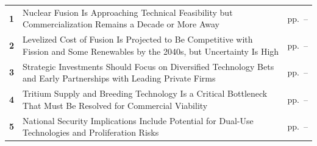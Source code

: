 \documentclass[10pt,a4paper]{article}
\begin{document}
\begin{tabularx}{\linewidth}{p{8mm}Yp{29mm}}
\textcolor{BOBlue}{\bfseries 1} & Nuclear Fusion Is Approaching Technical Feasibility but Commercialization Remains a Decade or More Away & {\color{BOMuted}pp.~\pageref{chap:1}--\pageref{chap:1:end}} \\[3pt]
\textcolor{BOBlue}{\bfseries 2} & Levelized Cost of Fusion Is Projected to Be Competitive with Fission and Some Renewables by the 2040s, but Uncertainty Is High & {\color{BOMuted}pp.~\pageref{chap:2}--\pageref{chap:2:end}} \\[3pt]
\textcolor{BOBlue}{\bfseries 3} & Strategic Investments Should Focus on Diversified Technology Bets and Early Partnerships with Leading Private Firms & {\color{BOMuted}pp.~\pageref{chap:3}--\pageref{chap:3:end}} \\[3pt]
\textcolor{BOBlue}{\bfseries 4} & Tritium Supply and Breeding Technology Is a Critical Bottleneck That Must Be Resolved for Commercial Viability & {\color{BOMuted}pp.~\pageref{chap:4}--\pageref{chap:4:end}} \\[3pt]
\textcolor{BOBlue}{\bfseries 5} & National Security Implications Include Potential for Dual-Use Technologies and Proliferation Risks & {\color{BOMuted}pp.~\pageref{chap:5}--\pageref{chap:5:end}} \\[3pt]
\end{tabularx}
\clearpage
\end{document}
